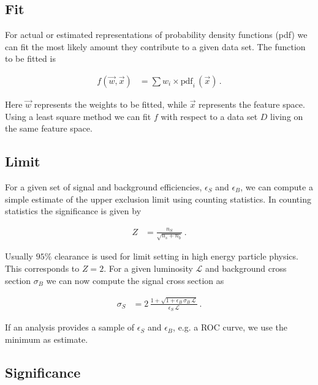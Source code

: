\subsection{Fit}

For actual or estimated representations of probability density
functions (pdf) we can fit the most likely amount they contribute to a
given data set. The function to be fitted is
%
\begin{ceqn}
  \begin{align}
     f\left(\vec{w},\vec{x}\right) &= \sum w_i \times \text{pdf}_i\,\left(\vec{x}\right)\,.
  \end{align}
\end{ceqn}
%
Here $\vec{w}$ represents the weights to be fitted, while $\vec{x}$
represents the feature space. Using a least square method we can fit
$f$ with respect to a data set $D$ living on the same feature space.

\subsection{Limit}

For a given set of signal and background efficiencies, $\epsilon_S$
and $\epsilon_B$, we can compute a simple estimate of the upper
exclusion limit using counting statistics. In counting statistics the
significance is given by
%
\begin{ceqn}
  \begin{align}
     Z &= \frac{ n_S }{ \sqrt{ n_s + n_b }}\,.
     \label{eq:significance}
  \end{align}
\end{ceqn}
%
Usually $95\%$ clearance is used for limit setting in high energy
particle physics. This corresponds to $Z=2$. For a given luminosity
$\mathcal{L}$ and background cross section $\sigma_B$ we can now
compute the signal cross section as
%
\begin{ceqn}
  \begin{align}
     \sigma_S &= 2\,\frac{ 1 + \sqrt{ 1 + \epsilon_B\,\sigma_B\,\mathcal{L} } }{ \epsilon_S\,\mathcal{L} }\,.
  \end{align}
\end{ceqn}
%
If an analysis provides a sample of $\epsilon_S$ and $\epsilon_B$,
e.g. a ROC curve, we use the minimum as estimate.

\subsection{Significance}

